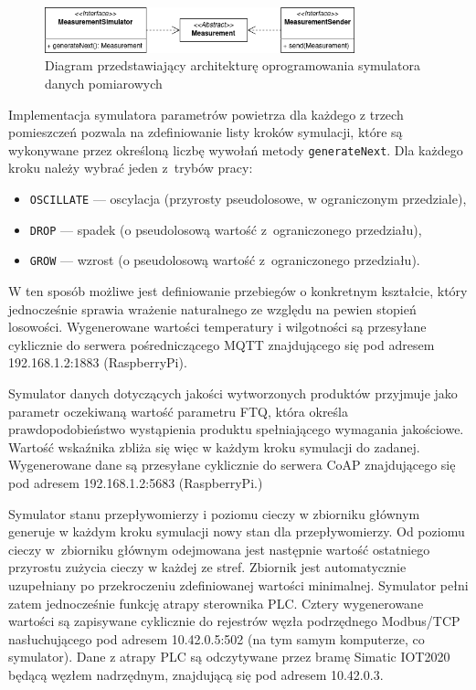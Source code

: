 \documentclass[a4paper, 12pt, twoside]{article}
\begin{document}
\begin{figure}[h]
      \centering
      \includegraphics[width=0.8\textwidth]{iot-sim-architecture.png}
      \caption{Diagram przedstawiający architekturę oprogramowania symulatora danych pomiarowych}
      \label{fig:iot-sim}
\end{figure}

Implementacja symulatora parametrów powietrza dla każdego z trzech pomieszczeń
pozwala na zdefiniowanie listy kroków
symulacji, które są wykonywane przez określoną liczbę wywołań metody
\texttt{generateNext}. Dla każdego kroku należy wybrać jeden z~trybów pracy:
\begin{itemize}
      \itemsep0em
      \item \texttt{OSCILLATE} --- oscylacja (przyrosty pseudolosowe, w ograniczonym przedziale),
      \item \texttt{DROP} --- spadek (o pseudolosową wartość z~ograniczonego przedziału),
      \item \texttt{GROW} --- wzrost (o pseudolosową wartość z~ograniczonego przedziału).
\end{itemize}
\noindent W ten sposób możliwe jest definiowanie przebiegów o konkretnym kształcie,
który jednocześnie sprawia wrażenie naturalnego ze względu na pewien stopień losowości. Wygenerowane
wartości temperatury i wilgotności są przesyłane cyklicznie do serwera pośredniczącego MQTT znajdującego
się pod adresem 192.168.1.2:1883 (RaspberryPi).

Symulator danych dotyczących jakości wytworzonych produktów przyjmuje jako parametr
oczekiwaną wartość parametru FTQ, która określa prawdopodobieństwo wystąpienia
produktu spełniającego wymagania jakościowe. Wartość wskaźnika zbliża się więc
w każdym kroku symulacji do zadanej. Wygenerowane dane są przesyłane cyklicznie
do serwera CoAP znajdującego się pod adresem 192.168.1.2:5683 (RaspberryPi.)

Symulator stanu przepływomierzy i poziomu cieczy w zbiorniku głównym generuje
w każdym kroku symulacji nowy stan dla przepływomierzy. Od poziomu cieczy w~zbiorniku głównym
odejmowana jest następnie wartość ostatniego przyrostu zużycia cieczy w każdej ze stref.
Zbiornik jest automatycznie uzupełniany po przekroczeniu zdefiniowanej wartości minimalnej.
Symulator pełni zatem jednocześnie funkcję atrapy sterownika PLC. Cztery wygenerowane
wartości są zapisywane cyklicznie do rejestrów węzła podrzędnego Modbus/TCP nasłuchującego
pod adresem 10.42.0.5:502 (na tym samym komputerze, co symulator). Dane
z atrapy PLC są odczytywane przez bramę Simatic IOT2020 będącą węzłem nadrzędnym,
znajdującą się pod adresem 10.42.0.3.
\end{document}
